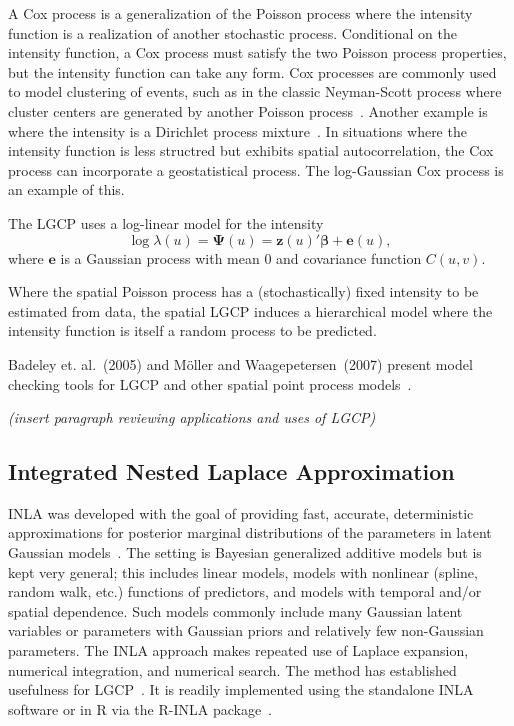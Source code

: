 \documentclass[]{interact}
\begin{document}
A Cox process is a generalization of the Poisson process where the intensity
function is a realization of another stochastic process. Conditional on the
intensity function, a Cox process must satisfy the two Poisson process
properties, but the intensity function can take any form. Cox processes are
commonly used to model clustering of events, such as in the classic
Neyman-Scott process where cluster centers are generated by another Poisson
process~\cite{neymanscott}. Another example is where the intensity is a
Dirichlet process mixture~\cite{taddy}. In situations where the intensity
function is less structred but exhibits spatial autocorrelation, the Cox
process can incorporate a geostatistical process. The log-Gaussian Cox process
is an example of this.

The LGCP uses a log-linear model for the intensity
\begin{displaymath}
\log\lambda(u) = \boldsymbol{\Psi}(u)
= \mathbf{z}(u)' \boldsymbol{\beta} + \mathbf{e}(u),
\end{displaymath}
where \(\mathbf{e}\) is a Gaussian process with mean 0 and covariance function
\(C(u, v)\).

Where the spatial Poisson process has a (stochastically) fixed intensity to be
estimated from data, the spatial LGCP induces a hierarchical model where the
intensity function is itself a random process to be predicted.

Badeley et. al.~(2005) and M\"{o}ller and Waagepetersen~(2007) present model
checking tools for LGCP and other spatial point process
models~\cite{baddeleyresiduals,moellerwaagepetersen}.

{\it (insert paragraph reviewing applications and uses of LGCP)}


\subsection{Integrated Nested Laplace Approximation}
\label{inla}

INLA was developed with the goal of providing fast, accurate, deterministic
approximations for posterior marginal distributions of the parameters in
latent Gaussian models~\cite{rueetal}. The setting is Bayesian generalized
additive models but is kept very general; this includes linear models, models
with nonlinear (spline, random walk, etc.) functions of predictors, and models
with temporal and/or spatial dependence. Such models commonly include many
Gaussian latent variables or parameters with Gaussian priors and relatively
few non-Gaussian parameters. The INLA approach makes repeated use of Laplace
expansion, numerical integration, and numerical search. The method has
established usefulness for LGCP~\cite{illianetal}. It is readily implemented
using the standalone INLA software or in R via the R-INLA
package~\cite{inlar}.
\end{document}
